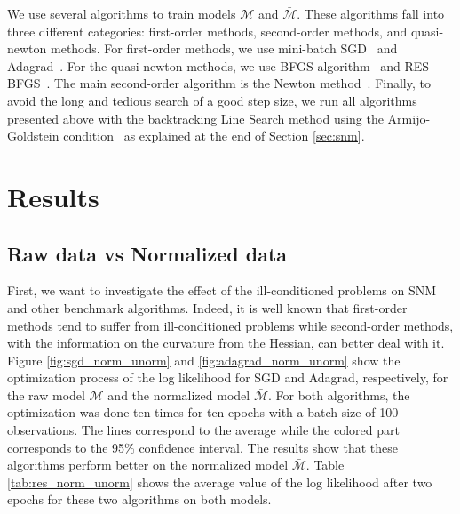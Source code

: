\documentclass[conference]{IEEEtran}
\begin{document}
We use several algorithms to train models $\mathcal{M}$ and $\bar{\mathcal{M}}$. These algorithms fall into three different categories: first-order methods, second-order methods, and quasi-newton methods. For first-order methods, we use mini-batch SGD~\cite{ruder_overview_2016} and Adagrad~\cite{duchi_adaptive_2011}. For the quasi-newton methods, we use BFGS algorithm~\cite{fletcher_practical_1987} and RES-BFGS~\cite{mokhtari_res:_2014}. The main second-order algorithm is the Newton method~\cite{caswell_treatise_1685}. Finally, to avoid the long and tedious search of a good step size, we run all algorithms presented above with the backtracking Line Search method using the Armijo-Goldstein condition~\cite{armijo_minimization_1966} as explained at the end of Section \ref{sec:snm}. \\

\section{Results}
\label{sec:res}

\subsection{Raw data vs Normalized data}
\label{sec:norm_unorm}

First, we want to investigate the effect of the ill-conditioned problems on SNM and other benchmark algorithms. Indeed, it is well known that first-order methods tend to suffer from ill-conditioned problems while second-order methods, with the information on the curvature from the Hessian, can better deal with it. Figure \ref{fig:sgd_norm_unorm} and \ref{fig:adagrad_norm_unorm} show the optimization process of the log likelihood for SGD and Adagrad, respectively, for the raw model $\mathcal{M}$ and the normalized model $\bar{\mathcal{M}}$. For both algorithms, the optimization was done ten times for ten epochs with a batch size of 100 observations. The lines correspond to the average while the colored part corresponds to the 95\% confidence interval. The results show that these algorithms perform better on the normalized model $\bar{\mathcal{M}}$. Table \ref{tab:res_norm_unorm} shows the average value of the log likelihood after two epochs for these two algorithms on both models.
\end{document}
